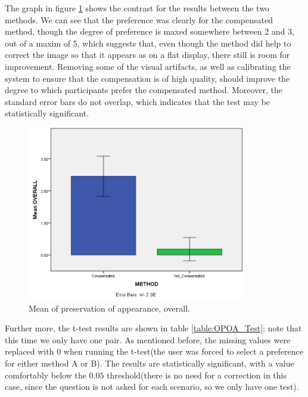 \documentclass[]{article}
\begin{document}
The graph in figure \ref{fig:OPOA_Graph} shows the contrast for the results between the two methods. We can see that the preference was clearly for the compensated method, though the degree of preference is maxed somewhere between 2 and 3, out of a maxim of 5, which suggests that, even though the method did help to correct the image so that it appears as on a flat display, there still is room for improvement. Removing some of the visual artifacts, as well as calibrating the system to ensure that the compensation is of high quality, should improve the degree to which participants prefer the compensated method. Moreover, the standard error bars do not overlap, which indicates that the test may be statistically significant. 

\begin{figure}[!h]
    \centering
    \includegraphics[width=0.85\textwidth]{figures/results/OPOA_Graph.PNG}
    \caption{Mean of preservation of appearance, overall.}
    \label{fig:OPOA_Graph}
\end{figure}

Further more, the t-test results are shown in table \ref{table:OPOA_Test}; note that this time we only have one pair. As mentioned before, the missing values were replaced with 0 when running the t-test(the user was forced to select a preference for either method A or B). The results are statistically significant, with a value comfortably below the $0.05$ threshold(there is no need for a correction in this case, since the question is not asked for each scenario, so we only have one test). 

\end{document}

